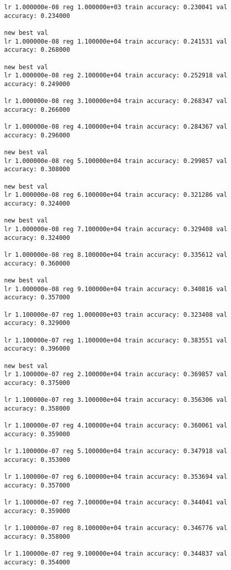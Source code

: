 \documentclass[11pt]{article}
\begin{document}
    \begin{Verbatim}[commandchars=\\\{\}]
lr 1.000000e-08 reg 1.000000e+03 train accuracy: 0.230041 val accuracy: 0.234000

new best val
lr 1.000000e-08 reg 1.100000e+04 train accuracy: 0.241531 val accuracy: 0.268000

new best val
lr 1.000000e-08 reg 2.100000e+04 train accuracy: 0.252918 val accuracy: 0.249000

lr 1.000000e-08 reg 3.100000e+04 train accuracy: 0.268347 val accuracy: 0.266000

lr 1.000000e-08 reg 4.100000e+04 train accuracy: 0.284367 val accuracy: 0.296000

new best val
lr 1.000000e-08 reg 5.100000e+04 train accuracy: 0.299857 val accuracy: 0.308000

new best val
lr 1.000000e-08 reg 6.100000e+04 train accuracy: 0.321286 val accuracy: 0.324000

new best val
lr 1.000000e-08 reg 7.100000e+04 train accuracy: 0.329408 val accuracy: 0.324000

lr 1.000000e-08 reg 8.100000e+04 train accuracy: 0.335612 val accuracy: 0.360000

new best val
lr 1.000000e-08 reg 9.100000e+04 train accuracy: 0.340816 val accuracy: 0.357000

lr 1.100000e-07 reg 1.000000e+03 train accuracy: 0.323408 val accuracy: 0.329000

lr 1.100000e-07 reg 1.100000e+04 train accuracy: 0.383551 val accuracy: 0.396000

new best val
lr 1.100000e-07 reg 2.100000e+04 train accuracy: 0.369857 val accuracy: 0.375000

lr 1.100000e-07 reg 3.100000e+04 train accuracy: 0.356306 val accuracy: 0.358000

lr 1.100000e-07 reg 4.100000e+04 train accuracy: 0.360061 val accuracy: 0.359000

lr 1.100000e-07 reg 5.100000e+04 train accuracy: 0.347918 val accuracy: 0.353000

lr 1.100000e-07 reg 6.100000e+04 train accuracy: 0.353694 val accuracy: 0.357000

lr 1.100000e-07 reg 7.100000e+04 train accuracy: 0.344041 val accuracy: 0.359000

lr 1.100000e-07 reg 8.100000e+04 train accuracy: 0.346776 val accuracy: 0.358000

lr 1.100000e-07 reg 9.100000e+04 train accuracy: 0.344837 val accuracy: 0.354000


\end{Verbatim}
\end{document}
